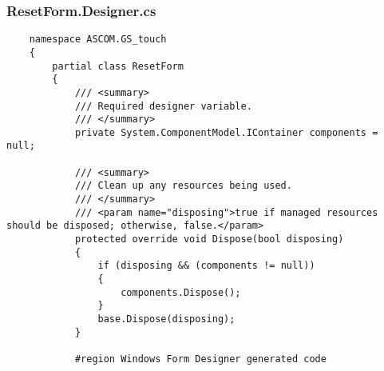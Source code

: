 \subsubsection{ResetForm.Designer.cs}
\begin{lstlisting}
	namespace ASCOM.GS_touch
	{
		partial class ResetForm
		{
			/// <summary>
			/// Required designer variable.
			/// </summary>
			private System.ComponentModel.IContainer components = null;
			
			/// <summary>
			/// Clean up any resources being used.
			/// </summary>
			/// <param name="disposing">true if managed resources should be disposed; otherwise, false.</param>
			protected override void Dispose(bool disposing)
			{
				if (disposing && (components != null))
				{
					components.Dispose();
				}
				base.Dispose(disposing);
			}
			
			#region Windows Form Designer generated code
			

\end{lstlisting}
